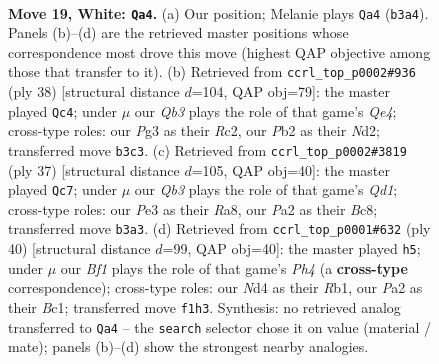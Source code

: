 \documentclass[11pt]{article}
\begin{document}
\clearpage

\begin{figure}[p]\centering
\begin{subfigure}{0.46\textwidth}\centering
\resizebox{\linewidth}{!}{%
\newchessgame
\chessboard[
  setfen={1rbrn1k1/p1p1qp2/6p1/n1PpP2p/1p1N4/1Q2P1P1/PP1B1P1P/2K1RBR1 w - - 2 19},
  showmover=false,
  pgfstyle=straightmove, color=movearrow, markmove={b3-a4}
]}
\caption{}
\end{subfigure}\hfill
\begin{subfigure}{0.46\textwidth}\centering
\resizebox{\linewidth}{!}{%
\newchessgame
\chessboard[
  setfen={r5k1/1pprb2p/2n3p1/3qpp2/p3Q3/P2PB1P1/1PRNPP1P/2R3K1 w - - 0 20},
  showmover=false,
  pgfstyle=straightmove, color=movearrow, markmove={e4-c4}
]}
\caption{}
\end{subfigure}
\\[4pt]
\begin{subfigure}{0.46\textwidth}\centering
\resizebox{\linewidth}{!}{%
\newchessgame
\chessboard[
  setfen={r1bqr1k1/4ppbp/p5p1/P3P2n/2pN2P1/2N4P/1PP5/R1BQR1K1 b - - 0 19},
  showmover=false,
  pgfstyle=straightmove, color=movearrow, markmove={d8-c7}
]}
\caption{}
\end{subfigure}\hfill
\begin{subfigure}{0.46\textwidth}\centering
\resizebox{\linewidth}{!}{%
\newchessgame
\chessboard[
  setfen={k1r2b1r/1pq2pp1/p1n1p2p/3pP3/b2P3P/PNP2Q2/5PP1/1RBBR1K1 w - - 6 21},
  showmover=false,
  pgfstyle=straightmove, color=movearrow, markmove={h4-h5}
]}
\caption{}
\end{subfigure}
\caption{\textbf{Move 19, White: \texttt{Qa4}.} (a) Our position; Melanie plays \texttt{Qa4} (\texttt{b3a4}). Panels (b)--(d) are the retrieved master positions whose correspondence most drove this move (highest QAP objective among those that transfer to it). (b) Retrieved from \texttt{ccrl\_top\_p0002\#936} (ply 38) [structural distance $d$=104, QAP obj=79]: the master played \texttt{Qc4}; under $\mu$ our \emph{Qb3} plays the role of that game's \emph{Qe4}; cross-type roles: our \emph{P}g3 as their \emph{R}c2, our \emph{P}b2 as their \emph{N}d2; transferred move \texttt{b3c3}. (c) Retrieved from \texttt{ccrl\_top\_p0002\#3819} (ply 37) [structural distance $d$=105, QAP obj=40]: the master played \texttt{Qc7}; under $\mu$ our \emph{Qb3} plays the role of that game's \emph{Qd1}; cross-type roles: our \emph{P}e3 as their \emph{R}a8, our \emph{P}a2 as their \emph{B}c8; transferred move \texttt{b3a3}. (d) Retrieved from \texttt{ccrl\_top\_p0001\#632} (ply 40) [structural distance $d$=99, QAP obj=40]: the master played \texttt{h5}; under $\mu$ our \emph{Bf1} plays the role of that game's \emph{Ph4} (a \textbf{cross-type} correspondence); cross-type roles: our \emph{N}d4 as their \emph{R}b1, our \emph{P}a2 as their \emph{B}c1; transferred move \texttt{f1h3}. Synthesis: no retrieved analog transferred to \texttt{Qa4} -- the \texttt{search} selector chose it on value (material / mate); panels (b)--(d) show the strongest nearby analogies.}
\label{fig:thought-m36}
\end{figure}
\end{document}
